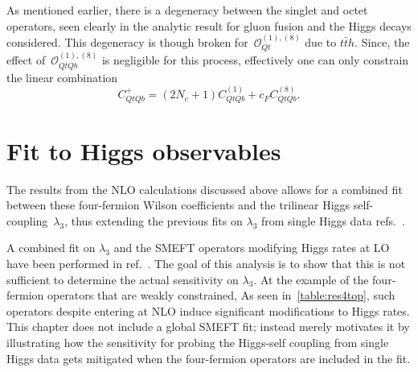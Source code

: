 	\par As mentioned earlier, there is a degeneracy between the singlet and octet operators, seen clearly in the analytic result for gluon fusion and the Higgs decays considered. This degeneracy is though broken for~$\mathcal O_{Qt}^{(1),(8)}$ due to $t\bar t h$. Since, the effect of~$\mathcal O_{QtQb}^{(1),(8)}$ is negligible for this process, effectively one can only constrain the linear combination
	\begin{equation}
		C_{QtQb}^+= (2N_c+1 )C_{QtQb}^{(1)} + c_F   C_{QtQb}^{(8)}.
		\label{eq:CQtQbplus}
	\end{equation}

	\section{Fit to Higgs observables \label{sec:fit}}
	
	\par The results from the  NLO calculations discussed above allows for a combined fit between these four-fermion Wilson coefficients and the trilinear Higgs self-coupling~$\lambda_3$, thus extending the previous fits on $\lambda_3$ from single Higgs data refs.~\cite{Gorbahn:2016uoy, Degrassi:2016wml, Bizon:2016wgr, Maltoni:2017ims, Degrassi:2021uik}.

A combined fit on $\lambda_3$ and the SMEFT operators modifying Higgs rates at LO have been performed in ref.~\cite{DiVita:2017eyz}. The goal of this analysis is to show that this is not sufficient to determine the actual sensitivity on $\lambda_3$. At the example of the four-fermion operators that are weakly constrained, As seen in~\autoref{table:res4top}, such operators despite entering at NLO induce significant modifications to Higgs rates.
	This chapter does not include a global SMEFT fit; instead merely motivates it by illustrating how the sensitivity for probing the Higgs-self coupling from single Higgs data gets mitigated when the four-fermion operators are included in the fit.

